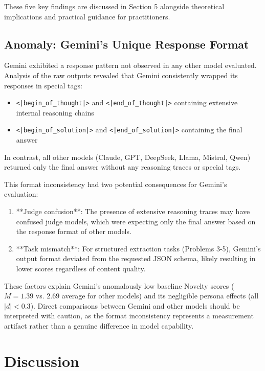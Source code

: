 \documentclass{article}
\begin{document}
These five key findings are discussed in Section 5 alongside theoretical implications and practical guidance for practitioners.

\subsection{Anomaly: Gemini's Unique Response Format}

Gemini exhibited a response pattern not observed in any other model evaluated. Analysis of the raw outputs revealed that Gemini consistently wrapped its responses in special tags:

\begin{itemize}
    \item \texttt{<|begin\_of\_thought|>} and \texttt{<|end\_of\_thought|>} containing extensive internal reasoning chains
    \item \texttt{<|begin\_of\_solution|>} and \texttt{<|end\_of\_solution|>} containing the final answer
\end{itemize}

In contrast, all other models (Claude, GPT, DeepSeek, Llama, Mistral, Qwen) returned only the final answer without any reasoning traces or special tags.

This format inconsistency had two potential consequences for Gemini's evaluation:

\begin{enumerate}
    \item **Judge confusion**: The presence of extensive reasoning traces may have confused judge models, which were expecting only the final answer based on the response format of other models.
    \item **Task mismatch**: For structured extraction tasks (Problems 3-5), Gemini's output format deviated from the requested JSON schema, likely resulting in lower scores regardless of content quality.
\end{enumerate}

These factors explain Gemini's anomalously low baseline Novelty scores ($M = 1.39$ vs. $2.69$ average for other models) and its negligible persona effects (all $|d| < 0.3$). Direct comparisons between Gemini and other models should be interpreted with caution, as the format inconsistency represents a measurement artifact rather than a genuine difference in model capability.


\section{Discussion}
\end{document}
